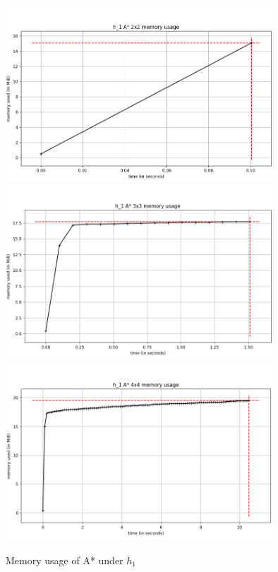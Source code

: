 \documentclass[runningheads]{llncs}
\begin{document}
\begin{figure}
\begin{center}
    \includegraphics[width=10cm]{a_star_h1_2x2.png}
    \includegraphics[width=10cm]{a_star_h1_3x3.png}
    \includegraphics[width=10cm]{a_star_h1_4x4.png}
    \caption{Memory usage of A* under $h_1$} \label{fig3}
\end{center}
\end{figure}
\end{document}
